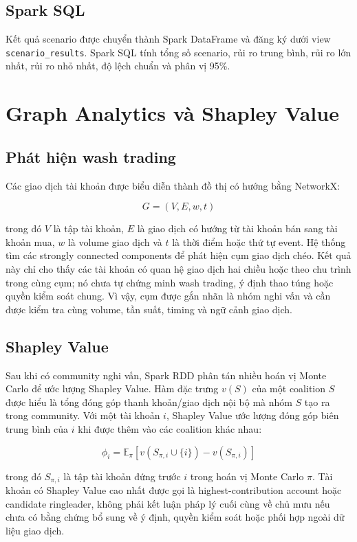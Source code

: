 \documentclass[12pt,a4paper]{report}
\begin{document}
\section{Spark SQL}

Kết quả scenario được chuyển thành Spark DataFrame và đăng ký dưới view \texttt{scenario\_results}. Spark SQL tính tổng số scenario, rủi ro trung bình, rủi ro lớn nhất, rủi ro nhỏ nhất, độ lệch chuẩn và phân vị 95\%.

\chapter{Graph Analytics và Shapley Value}

\section{Phát hiện wash trading}

Các giao dịch tài khoản được biểu diễn thành đồ thị có hướng bằng NetworkX:

\[
G=(V,E,w,t)
\]

trong đó \(V\) là tập tài khoản, \(E\) là giao dịch có hướng từ tài khoản bán sang tài khoản mua, \(w\) là volume giao dịch và \(t\) là thời điểm hoặc thứ tự event. Hệ thống tìm các strongly connected components để phát hiện cụm giao dịch chéo. Kết quả này chỉ cho thấy các tài khoản có quan hệ giao dịch hai chiều hoặc theo chu trình trong cùng cụm; nó chưa tự chứng minh wash trading, ý định thao túng hoặc quyền kiểm soát chung. Vì vậy, cụm được gắn nhãn là nhóm nghi vấn và cần được kiểm tra cùng volume, tần suất, timing và ngữ cảnh giao dịch.

\section{Shapley Value}

Sau khi có community nghi vấn, Spark RDD phân tán nhiều hoán vị Monte Carlo để ước lượng Shapley Value. Hàm đặc trưng \(v(S)\) của một coalition \(S\) được hiểu là tổng đóng góp thanh khoản/giao dịch nội bộ mà nhóm \(S\) tạo ra trong community. Với một tài khoản \(i\), Shapley Value ước lượng đóng góp biên trung bình của \(i\) khi được thêm vào các coalition khác nhau:

\[
\phi_i=\mathbb{E}_{\pi}\left[v(S_{\pi,i}\cup\{i\})-v(S_{\pi,i})\right]
\]

trong đó \(S_{\pi,i}\) là tập tài khoản đứng trước \(i\) trong hoán vị Monte Carlo \(\pi\). Tài khoản có Shapley Value cao nhất được gọi là highest-contribution account hoặc candidate ringleader, không phải kết luận pháp lý cuối cùng về chủ mưu nếu chưa có bằng chứng bổ sung về ý định, quyền kiểm soát hoặc phối hợp ngoài dữ liệu giao dịch.
\end{document}
